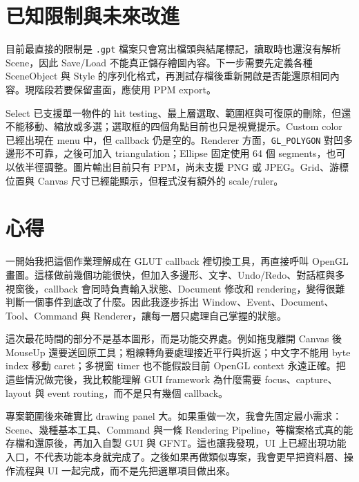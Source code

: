 \section{已知限制與未來改進}
\label{sec:limitations}

目前最直接的限制是 \lstinline|.gpt| 檔案只會寫出檔頭與結尾標記，讀取時也還沒有解析 Scene，因此 Save/Load 不能真正儲存繪圖內容。下一步需要先定義各種 SceneObject 與 Style 的序列化格式，再測試存檔後重新開啟是否能還原相同內容。現階段若要保留畫面，應使用 PPM export。

Select 已支援單一物件的 hit testing、最上層選取、範圍框與可復原的刪除，但還不能移動、縮放或多選；選取框的四個角點目前也只是視覺提示。Custom color 已經出現在 menu 中，但 callback 仍是空的。Renderer 方面，\lstinline|GL_POLYGON| 對凹多邊形不可靠，之後可加入 triangulation；Ellipse 固定使用 64 個 segments，也可以依半徑調整。圖片輸出目前只有 PPM，尚未支援 PNG 或 JPEG。Grid、游標位置與 Canvas 尺寸已經能顯示，但程式沒有額外的 scale/ruler。

\section{心得}

一開始我把這個作業理解成在 GLUT callback 裡切換工具，再直接呼叫 OpenGL 畫圖。這樣做前幾個功能很快，但加入多邊形、文字、Undo/Redo、對話框與多視窗後，callback 會同時負責輸入狀態、Document 修改和 rendering，變得很難判斷一個事件到底改了什麼。因此我逐步拆出 Window、Event、Document、Tool、Command 與 Renderer，讓每一層只處理自己掌握的狀態。

這次最花時間的部分不是基本圖形，而是功能交界處。例如拖曳離開 Canvas 後 MouseUp 還要送回原工具；粗線轉角要處理接近平行與折返；中文字不能用 byte index 移動 caret；多視窗 timer 也不能假設目前 OpenGL context 永遠正確。把這些情況做完後，我比較能理解 GUI framework 為什麼需要 focus、capture、layout 與 event routing，而不是只有幾個 callback。

專案範圍後來確實比 drawing panel 大。如果重做一次，我會先固定最小需求：Scene、幾種基本工具、Command 與一條 Rendering Pipeline，等檔案格式真的能存檔和還原後，再加入自製 GUI 與 GFNT。這也讓我發現，UI 上已經出現功能入口，不代表功能本身就完成了。之後如果再做類似專案，我會更早把資料層、操作流程與 UI 一起完成，而不是先把選單項目做出來。
